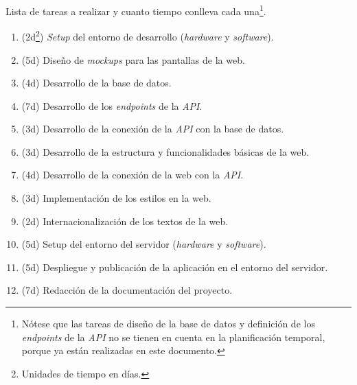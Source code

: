 \documentclass[12pt,a4paper,titlepage]{article}
\begin{document}

    Lista de tareas a realizar y cuanto tiempo conlleva cada una\footnote{Nótese que las tareas de diseño de la base de datos y definición de los \textit{endpoints} de la \textit{API} no se tienen en cuenta en la planificación temporal, porque ya están realizadas en este documento.}.

    \begin{enumerate}
        \renewcommand{\theenumi}{\Alph{enumi}} %
        \item (2d\footnote{Unidades de tiempo en días.}) \textit{Setup} del entorno de desarrollo (\textit{hardware} y \textit{software}).
        \item (5d) Diseño de \textit{mockups} para las pantallas de la web.
        \item (4d) Desarrollo de la base de datos.
        \item (7d) Desarrollo de los \textit{endpoints} de la \textit{API}.
        \item (3d) Desarrollo de la conexión de la \textit{API} con la base de datos.
        \item (3d) Desarrollo de la estructura y funcionalidades básicas de la web.
        \item (4d) Desarrollo de la conexión de la web con la \textit{API}.
        \item (3d) Implementación de los estilos en la web.
        \item (2d) Internacionalización de los textos de la web.
        \item (5d) Setup del entorno del servidor (\textit{hardware} y \textit{software}).
        \item (5d) Despliegue y publicación de la aplicación en el entorno del servidor.
        \item (7d) Redacción de la documentación del proyecto.
    \end{enumerate}
\end{document}
